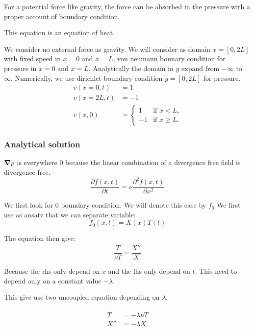 For a potential force like gravity, the force can be absorbed in the pressure with a proper account of boundary condition.

This equation is an equation of heat.

We consider no external force as gravity.
We will consider as domain $x=[0,2L]$ with fixed speed in $x=0$ and $x=L$, von neumann bounary condition for pressure in $x=0$ and $x=L$.
Analytically the domain in $y$ expand from $-\infty$ to $\infty$. Numerically, we use dirichlet boundary condition $y=[0,2L]$ for pressure.
\begin{align*}
    v(x=0,t)&=1\\
    v(x=2L,t)&=-1\\
    v(x,0)&=\begin{cases}
             1&\text{if $x<L$,}\\
             -1& \text{if $x\geq L$.}
            \end{cases}
\end{align*}

\subsubsection{Analytical solution}

${\boldsymbol {\nabla}}p$ is everywhere 0 because the linear combination of a divergence free field is divergence free.
\begin{equation}
\frac{\partial f(x,t)}{\partial t}=\nu\frac{\partial^2 f(x,t)}{\partial x^2}
\end{equation}

We first look for 0 boundary condition. We will denote this case by $f_0$
We first use as ansatz that we can separate variable:
\begin{equation}
 f_0(x,t)=X(x)T(t)
\end{equation}

The equation then give:
\begin{equation}
	\frac{\dot{T}}{\nu T}=\frac{X''}{X}
\end{equation}

Because the rhs only depend on $x$ and the lhs only depend on $t$. This need to depend only on a constant value $-\lambda$.

This give use two uncoupled equation depending on $\lambda$.

\begin{align}
\dot{T}&=-\lambda \nu T\\
X''&=-\lambda X
\end{align}

